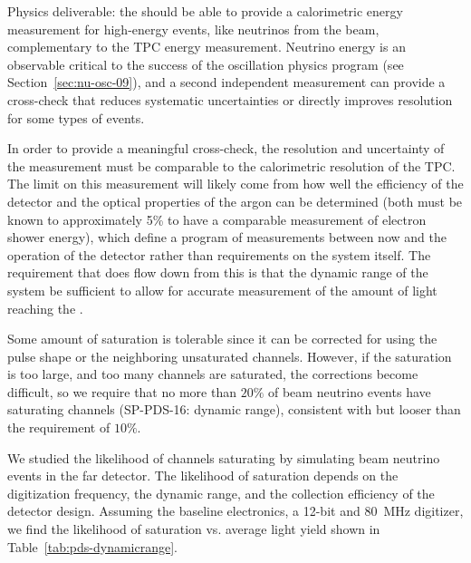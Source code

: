 Physics deliverable: the  should be able to provide a calorimetric energy measurement for high-energy events, like neutrinos from the  beam, complementary to the TPC energy measurement.
Neutrino energy is an observable critical to the success of the oscillation physics program (see Section~\ref{sec:nu-osc-09}), and a second independent measurement can provide a cross-check that reduces systematic uncertainties or directly improves resolution for some types of events. 

In order to provide a meaningful cross-check, the resolution and uncertainty of the  measurement must be comparable to the calorimetric resolution of the TPC. The limit on this measurement will likely come from how well the efficiency of the detector and the optical properties of the argon can be determined (both must be known to approximately 5\% to have a comparable measurement of electron shower energy), which define a program of measurements between now and the operation of the detector rather than requirements on the system itself. The requirement that does flow down from this is that the dynamic range of the system be sufficient to allow for accurate measurement of the amount of light reaching the . 


Some amount of saturation is tolerable since it can be corrected for using the pulse shape or the neighboring unsaturated channels. However, if the saturation is too large, and too many channels are saturated, the corrections become difficult, so we require that no more than $20\%$ of beam neutrino events have saturating channels (SP-PDS-16: dynamic range), consistent with but looser than the  requirement of $10\%$.

We studied the likelihood of channels saturating by simulating beam neutrino events in the far detector. The likelihood of saturation depends on the digitization frequency, the dynamic range, and the collection efficiency of the detector design. Assuming the baseline electronics, a 12-bit and \SI{80}{MHz} digitizer, we find the likelihood of saturation vs. average light yield shown in Table~\ref{tab:pds-dynamicrange}. 

